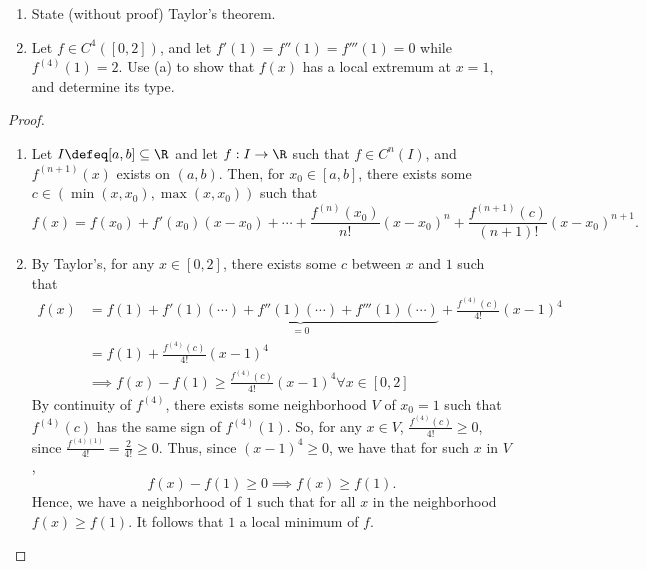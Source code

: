 \begin{question}
    \begin{enumerate}[label=(\alph*)]
        \item State (without proof) Taylor's theorem.
        \item Let $f \in C^4([0, 2])$, and let $f'(1) = f''(1) = f'''(1) = 0$ while $f^{(4)}(1) = 2$. Use (a) to show that $f(x)$ has a local extremum at $x = 1$, and determine its type.
    \end{enumerate}

\begin{proof}
    \begin{enumerate}[label=(\alph*)]
        \item Let $I \defeq [a, b] \subseteq \R$ and let $f : I \to \R$ such that $f \in C^n(I)$, and $f^{(n+1)}(x)$ exists on $(a, b)$. Then, for $x_0 \in [a, b]$, there exists some $c \in (\min(x, x_0), \max(x, x_0))$ such that \[
        f(x) = f(x_0) + f'(x_0)(x-x_0) + \cdots + \frac{f^{(n)}(x_0)}{n!}(x-x_0)^n + \frac{f^{(n+1)}(c)}{(n+1)!}(x-x_0)^{n+1}.
        \]
        \item By Taylor's, for any $x \in [0, 2]$, there exists some $c$ between $x$ and $1$ such that \begin{align*}
            f(x) &= f(1)+\underbrace{f'(1)(\cdots) + f''(1)(\cdots) + f'''(1)(\cdots) }_{=0}+ \frac{f^{(4)}(c)}{4!}(x-1)^4\\
            &=f(1) + \frac{f^{(4)}(c)}{4!}(x-1)^4 \\
            &\implies f(x) - f(1) \geq \frac{f^{(4)}(c)}{4!}(x-1)^4 \forall x \in [0, 2]
        \end{align*}
        By continuity of $f^{(4)}$, there exists some neighborhood $V$ of $x_0 = 1$ such that $f^{(4)}(c)$ has the same sign of $f^{(4)}(1)$. So, for any $x \in V$, $\frac{f^{(4)}(c)}{4!} \geq 0$, since $\frac{f^{(4)(1)}}{4!} = \frac{2}{4!} \geq 0$. Thus, since $(x-1)^4 \geq 0$, we have that for such $x$ in $V$, \[
        f(x) - f(1)     \geq  0 \implies f(x) \geq f(1).
        \]
        Hence, we have a neighborhood of $1$ such that for all $x$ in the neighborhood $f(x) \geq f(1)$. It follows that $1$ a local minimum of $f$.
    \end{enumerate}
\end{proof}
\end{question}
